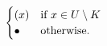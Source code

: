 \begin{dfn} 
\begin{equation*}
\begin{cases}
            (x) & \text{if } x \in U \setminus K\\
            \bullet & \text{otherwise.}
        \end{cases}
    \end{equation*}
    
\end{dfn}

